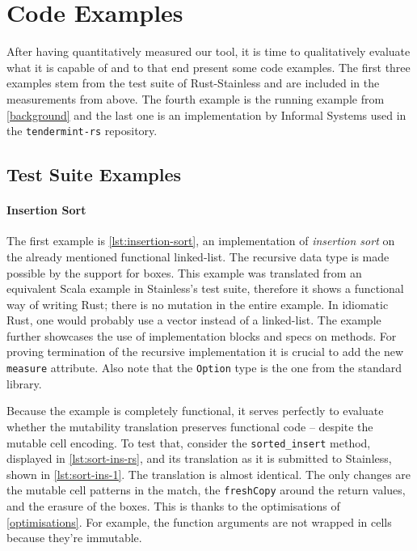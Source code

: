 


\section{Code Examples}

After having quantitatively measured our tool, it is time to qualitatively
evaluate what it is capable of and to that end present some code examples. The
first three examples stem from the test suite of Rust-Stainless and are included
in the measurements from above. The fourth example is the running example from
\autoref{background} and the last one is an implementation by Informal Systems
used in the \texttt{tendermint-rs} repository.

\subsection{Test Suite Examples}

\paragraph{Insertion Sort}

The first example is \autoref{lst:insertion-sort}, an implementation of
\emph{insertion sort} on the already mentioned functional linked-list. The
recursive data type is made possible by the support for boxes. This example was
translated from an equivalent Scala example in Stainless's test suite, therefore
it shows a functional way of writing Rust; there is no mutation in the entire
example. In idiomatic Rust, one would probably use a vector instead of a
linked-list. The example further showcases the use of implementation blocks and
specs on methods. For proving termination of the recursive implementation it is
crucial to add the new \lstinline!measure! attribute. Also note that the
\lstinline!Option! type is the one from the standard library.

Because the example is completely functional, it serves perfectly to evaluate
whether the  mutability translation preserves functional code -- despite the
mutable cell encoding. To test that, consider the \lstinline!sorted_insert!
method, displayed in \autoref{lst:sort-ins-rs}, and its translation as it is
submitted to Stainless, shown in \autoref{lst:sort-ins-1}. The translation is
almost identical. The only changes are the mutable cell patterns in the match,
the \lstinline!freshCopy! around the return values, and the erasure of the
boxes. This is thanks to the optimisations of \autoref{optimisations}. For
example, the function arguments are not wrapped in cells because they're
immutable.

